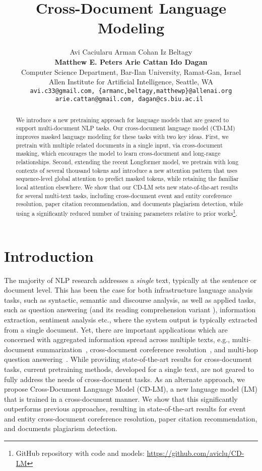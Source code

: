 \documentclass[11pt,a4paper]{article}
\title{Cross-Document Language Modeling}
\author{Avi Caciularu\hspace{1em} Arman Cohan\hspace{1em} Iz Beltagy\\
\textbf{Matthew E. Peters\hspace{1em} Arie Cattan\hspace{1em} Ido Dagan} \vspace{6pt}\\  
    Computer Science Department, Bar-Ilan University, Ramat-Gan, Israel\\
    Allen Institute for Artificial Intelligence, Seattle, WA\\
    {\tt avi.c33@gmail.com, \{armanc,beltagy,matthewp\}@allenai.org} \\
    {\tt arie.cattan@gmail.com, dagan@cs.biu.ac.il }
}
\date{}
\begin{document}
\maketitle

\begin{abstract}
We introduce a new pretraining approach for language models that are geared to support multi-document NLP tasks. Our cross-document language model (CD-LM) improves masked language modeling for these tasks with two key ideas.  First, we pretrain with multiple related documents in a single input, via cross-document masking, which encourages the model to learn cross-document and long-range relationships.  Second, extending the recent Longformer model, we pretrain with long contexts of several thousand tokens and introduce a new attention pattern that uses sequence-level global attention to predict masked tokens, while retaining the familiar local attention elsewhere. We show that our CD-LM sets new state-of-the-art results for several multi-text tasks, including cross-document event and entity coreference resolution, paper citation recommendation, and documents plagiarism detection, while using a significantly reduced number of training parameters relative to prior works\footnote{GitHub repository with code and models: \url{https://github.com/aviclu/CD-LM}}. 




\end{abstract} \section{Introduction}
\label{sec:intro}

The majority of NLP research addresses a \textit{single} text, typically at the sentence or document level. This has been the case for both infrastructure language analysis tasks, such as syntactic, semantic and discourse analysis, as well as applied tasks, such as question answering (and its reading comprehension variant \cite{xu-etal-2019-bert}), information extraction, sentiment analysis etc., where the system output is typically extracted from a single document. Yet, there are important applications which are concerned with aggregated information spread across multiple texts, e.g., multi-document summarization~\cite{fabbri-etal-2019-multi}, cross-document coreference resolution~\cite{cybulska2014using}, and multi-hop question answering~\cite{yang-etal-2018-hotpotqa}. While providing state-of-the-art results for cross-document tasks, current pretraining methods, developed for a single text, are not geared to fully address the needs of cross-document tasks. As an alternate approach, we propose Cross-Document Language Model (CD-LM), a new language model (LM) that is trained in a cross-document manner. We show that this significantly outperforms previous approaches, resulting in state-of-the-art results for event and entity cross-document coreference resolution, paper citation recommendation, and documents plagiarism detection.
\end{document}
